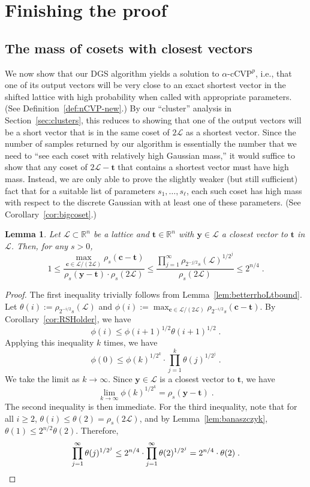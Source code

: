 \documentclass[11pt]{article}
\newtheorem{lemma}[theorem]{Lemma}
\newcommand{\R}{\ensuremath{\mathbb{R}}}
\renewcommand{\vec}[1]{\ensuremath{\mathbf{#1}}}
\newcommand{\problem}[1]{\mbox{#1}\xspace}
\newcommand{\scarequotes}[1]{``#1''}
\newcommand{\lat}{\mathcal{L}}
\begin{document}
\section{Finishing the proof}
\label{sec:DGSsolvesnCVP}
\subsection{The mass of cosets with closest vectors}



We now show that our DGS algorithm yields a solution to $\alpha\text{-}\problem{cCVP}^p$, i.e., that one of its output vectors will be very close to an exact shortest vector in the shifted lattice with high probability when called with appropriate parameters. (See Definition~\ref{def:nCVP-new}.) By our \scarequotes{cluster} analysis in Section~\ref{sec:clusters}, this reduces to showing that one of the output vectors will be a short vector that is in the same coset of $2\lat$ as a shortest vector. Since the number of samples returned by our algorithm is essentially the number that we need to \scarequotes{see each coset with relatively high Gaussian mass,} it would suffice to show that any coset of $2\lat - \vec{t}$ that contains a shortest vector must have high mass. Instead, we are only able to prove the slightly weaker (but still sufficient) fact that for a suitable list of parameters $s_1,\ldots, s_\ell$, each such coset has high mass with respect to the discrete Gaussian with at least one of these parameters. (See Corollary~\ref{cor:bigcoset}.)

\begin{lemma}
\label{lem:bigcoset1}
Let $\lat \subset \R^n$ be a lattice and $\vec{t} \in \R^n$ with $\vec{y} \in \lat$ a closest vector to $\vec{t}$ in $\lat$. Then, for any  $s > 0$,
\[ 
1 \le \frac{ \max_{\vec{c} \in \lat/(2\lat)}\rho_{s}(\vec{c} - \vec{t})}{\rho_{s}(\vec{y} - \vec{t}) \cdot \rho_{s}(2\lat)} \le \frac{\prod_{j=1}^{\infty} \rho_{2^{-j/2}s}(\lat)^{1/2^j}}{\rho_{s}(2\lat)} \le 2^{n/4} 
\; .
\]
\end{lemma}
\begin{proof}
The first inequality trivially follows from Lemma~\ref{lem:betterrhoLtbound}. Let $\theta(i) := \rho_{2^{-i/2}s}(\lat)$ and $\phi(i) := \max_{\vec{c} \in \lat/(2\lat)}\rho_{2^{-i/2}s}(\vec{c} - \vec{t})$.
By Corollary~\ref{cor:RSHolder}, we have
\[
\phi(i) \leq \phi(i+1)^{1/2} \theta(i+1)^{1/2}\;.\]
 Applying this inequality $k$ times, we have
\[
\phi(0) \leq \phi(k)^{1/2^k} \cdot \prod_{j=1}^{k} \theta(j)^{1/2^j}
\; .
\]
We take the limit as $k \rightarrow \infty$. Since $\vec{y} \in \lat$ is a closest vector to $\vec{t}$, we have  
\[
\lim_{k \rightarrow \infty} \phi(k)^{1/2^k} = \rho_{s}(\vec{y} - \vec{t}) \;.
\]
The second inequality is then immediate. 
 For the third inequality, note that
for all $i \geq 2$, $\theta(i) \leq \theta(2) = \rho_s(2\lat)$, and by Lemma~\ref{lem:banaszczyk}, $\theta(1) \leq 2^{n/2} \theta(2)$. Therefore, 
\[
\prod_{j=1}^\infty \theta(j)^{1/2^j} \leq 2^{n/4} \cdot \prod_{j=1}^\infty \theta(2)^{1/2^j} = 2^{n/4} \cdot \theta(2)
\; . \qedhere
\]
\end{proof}
\end{document}
